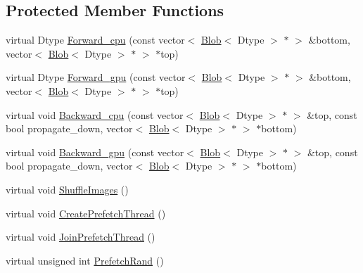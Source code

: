 \subsection*{Protected Member Functions}
\begin{DoxyCompactItemize}
\item 
virtual Dtype \hyperlink{classcaffe_1_1_image_data_layer_a3093be55fa03cc281778ba230a05456c}{Forward\+\_\+cpu} (const vector$<$ \hyperlink{classcaffe_1_1_blob}{Blob}$<$ Dtype $>$ $\ast$ $>$ \&bottom, vector$<$ \hyperlink{classcaffe_1_1_blob}{Blob}$<$ Dtype $>$ $\ast$ $>$ $\ast$top)
\item 
virtual Dtype \hyperlink{classcaffe_1_1_image_data_layer_a3719ea4c463b83e57ae7249e5e371332}{Forward\+\_\+gpu} (const vector$<$ \hyperlink{classcaffe_1_1_blob}{Blob}$<$ Dtype $>$ $\ast$ $>$ \&bottom, vector$<$ \hyperlink{classcaffe_1_1_blob}{Blob}$<$ Dtype $>$ $\ast$ $>$ $\ast$top)
\item 
virtual void \hyperlink{classcaffe_1_1_image_data_layer_aa94c13be8dcceb317b637c6ddf6cb0af}{Backward\+\_\+cpu} (const vector$<$ \hyperlink{classcaffe_1_1_blob}{Blob}$<$ Dtype $>$ $\ast$ $>$ \&top, const bool propagate\+\_\+down, vector$<$ \hyperlink{classcaffe_1_1_blob}{Blob}$<$ Dtype $>$ $\ast$ $>$ $\ast$bottom)
\item 
virtual void \hyperlink{classcaffe_1_1_image_data_layer_af467793e1c2184cd5016186c54167a20}{Backward\+\_\+gpu} (const vector$<$ \hyperlink{classcaffe_1_1_blob}{Blob}$<$ Dtype $>$ $\ast$ $>$ \&top, const bool propagate\+\_\+down, vector$<$ \hyperlink{classcaffe_1_1_blob}{Blob}$<$ Dtype $>$ $\ast$ $>$ $\ast$bottom)
\item 
virtual void \hyperlink{classcaffe_1_1_image_data_layer_a4cb51cd6f7ea31801d59164683ec5f64}{Shuffle\+Images} ()
\item 
virtual void \hyperlink{classcaffe_1_1_image_data_layer_a969b897fd9790b11862353f1940e07c0}{Create\+Prefetch\+Thread} ()
\item 
virtual void \hyperlink{classcaffe_1_1_image_data_layer_aaee5437acbba47d4f48f87df96ce12c9}{Join\+Prefetch\+Thread} ()
\item 
virtual unsigned int \hyperlink{classcaffe_1_1_image_data_layer_ab7009e152a69b4ba4fef5c88311a6adf}{Prefetch\+Rand} ()
\end{DoxyCompactItemize}
